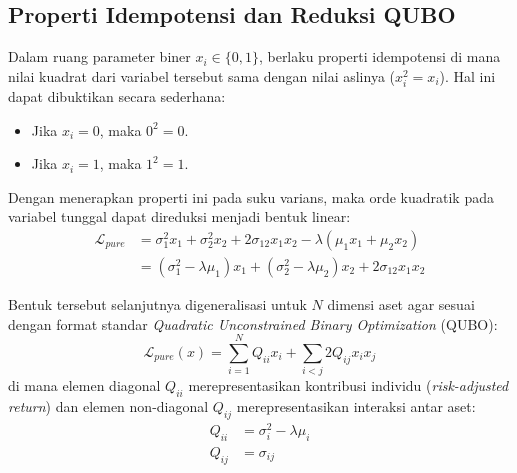 \subsection{Properti Idempotensi dan Reduksi QUBO}
Dalam ruang parameter biner $x_i \in \{0, 1\}$, berlaku properti idempotensi di mana nilai kuadrat dari variabel tersebut sama dengan nilai aslinya ($x_i^2 = x_i$). Hal ini dapat dibuktikan secara sederhana:
\begin{itemize}
    \item Jika $x_i = 0$, maka $0^2 = 0$.
    \item Jika $x_i = 1$, maka $1^2 = 1$.
\end{itemize}
Dengan menerapkan properti ini pada suku varians, maka orde kuadratik pada variabel tunggal dapat direduksi menjadi bentuk linear:
\begin{equation}
\begin{aligned}
\mathcal{L}_{pure} &= \sigma_1^2 x_1 + \sigma_2^2 x_2 + 2\sigma_{12}x_1 x_2 - \lambda(\mu_1 x_1 + \mu_2 x_2) \\
&= (\sigma_1^2 - \lambda \mu_1) x_1 + (\sigma_2^2 - \lambda \mu_2) x_2 + 2\sigma_{12}x_1 x_2
\end{aligned}
\end{equation}

Bentuk tersebut selanjutnya digeneralisasi untuk $N$ dimensi aset agar sesuai dengan format standar \textit{Quadratic Unconstrained Binary Optimization} (QUBO):
\begin{equation}
\mathcal{L}_{pure}(x) = \sum_{i=1}^N Q_{ii} x_i + \sum_{i < j} 2Q_{ij} x_i x_j
\end{equation}
di mana elemen diagonal $Q_{ii}$ merepresentasikan kontribusi individu (\textit{risk-adjusted return}) dan elemen non-diagonal $Q_{ij}$ merepresentasikan interaksi antar aset:
\begin{align}
Q_{ii} &= \sigma_i^2 - \lambda \mu_i \\
Q_{ij} &= \sigma_{ij}
\end{align}
